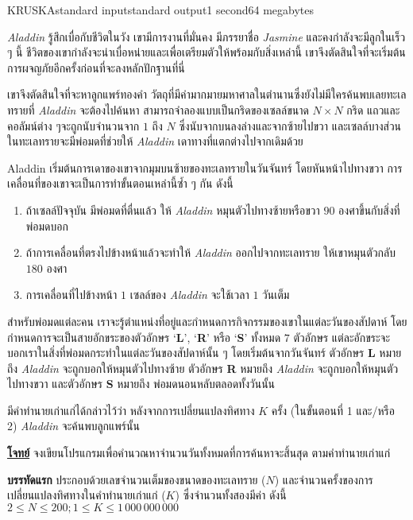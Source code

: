 \documentclass[11pt,a4paper]{article}
\begin{document}
\begin{problem}{KRUSKA}{standard input}{standard output}{1 second}{64 megabytes}

\textit{Aladdin} รู้สึกเบื่อกับชีวิตในวัง เขามีการงานที่มั่นคง มีภรรยาชื่อ \textit{Jasmine} และคงกำลังจะมีลูกในเร็ว ๆ นี้ ชีวิตของเขากำลังจะน่าเบื่อหน่ายและเพื่อเตรียมตัวให้พร้อมกับสิ่งเหล่านี้ เขาจึงตัดสินใจที่จะเริ่มต้นการผจญภัยอีกครั้งก่อนที่จะลงหลักปักฐานที่นี่

เขาจึงตัดสินใจที่จะหาลูกแพร์ทองคำ วัตถุที่มีค่ามากมายมหาศาลในตำนานซึ่งยังไม่มีใครค้นพบเลยทะเลทรายที่ \textit{Aladdin} จะต้องไปค้นหา สามารถจำลองแบบเป็นกริดของเซลล์ขนาด $N \times N$ กริด แถวและคอลัมน์ต่าง ๆจะถูกนับจำนวนจาก $1$ ถึง $N$ ซึ่งนับจากบนลงล่างและจากซ้ายไปขวา และเซลล์บางส่วนในทะเลทรายจะมีพ่อมดที่ช่วยให้ \textit{Aladdin} เดาทางที่แตกต่างไปจากเดิมด้วย

Aladdin เริ่มต้นการเดาของเขาจากมุมบนซ้ายของทะเลทรายในวันจันทร์ โดยหันหน้าไปทางขวา การเคลื่อนที่ของเขาจะเป็นการทำขั้นตอนเหล่านี้ซ้ำ ๆ กัน ดังนี้
\begin{enumerate}

\item ถ้าเซลล์ปัจจุบัน มีพ่อมดที่ตื่นแล้ว ให้ \textit{Aladdin} หมุนตัวไปทางซ้ายหรือขวา $90$ องศาขึ้นกับสิ่งที่พ่อมดบอก
\item ถ้าการเคลื่อนที่ตรงไปข้างหน้าแล้วจะทำให้ \textit{Aladdin} ออกไปจากทะเลทราย ให้เขาหมุนตัวกลับ $180$ องศา
\item การเคลื่อนที่ไปข้างหน้า $1$ เซลล์ของ \textit{Aladdin} จะใช้เวลา $1$ วันเต็ม
\end{enumerate}

สำหรับพ่อมดแต่ละคน เราจะรู้ตำแหน่งที่อยู่และกำหนดการกิจกรรมของเขาในแต่ละวันของสัปดาห์ โดยกำหนดการจะเป็นสายอักขระของตัวอักษร ‘\textbf{L}’, ‘\textbf{R}’ หรือ ‘\textbf{S}’ ทั้งหมด $7$ ตัวอักษร แต่ละอักขระจะบอกเราในสิ่งที่พ่อมดกระทำในแต่ละวันของสัปดาห์นั้น ๆ โดยเริ่มต้นจากวันจันทร์ ตัวอักษร \textbf{L} หมายถึง \textit{Aladdin} จะถูกบอกให้หมุนตัวไปทางซ้าย ตัวอักษร \textbf{R} หมายถึง \textit{Aladdin} จะถูกบอกให้หมุนตัวไปทางขวา และตัวอักษร \textbf{S} หมายถึง พ่อมดนอนหลับตลอดทั้งวันนั้น

มีคำทำนายเก่าแก่ได้กล่าวไว้ว่า หลังจากการเปลี่ยนแปลงทิศทาง $K$ ครั้ง (ในขั้นตอนที่ 1 และ/หรือ 2) \textit{Aladdin} จะค้นพบลูกแพร์นั้น

\bigskip
\underline{\textbf{โจทย์}}  จงเขียนโปรแกรมเพื่อคำนวณหาจำนวนวันทั้งหมดที่การค้นหาจะสิ้นสุด ตามคำทำนายเก่าแก่



\InputFile

\textbf{บรรทัดแรก} ประกอบด้วยเลขจำนวนเต็มของขนาดของทะเลทราย ($N$) และจำนวนครั้งของการเปลี่ยนแปลงทิศทางในคำทำนายเก่าแก่ ($K$) ซึ่งจำนวนทั้งสองมีค่า ดังนี้ $2 \leq N \leq 200;1 \leq K \leq 1\,000\,000\,000$


\end{problem}
\end{document}
